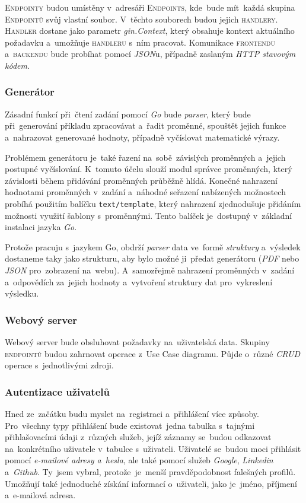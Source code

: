\documentclass[14pt,a4paper]{article}
\begin{document}
            \textsc{Endpointy} budou umístěny v~adresáři \textsc{Endpoints}, kde~bude mít~každá skupina \textsc{Endpointů} svůj vlastní soubor. V~těchto souborech budou jejich \textsc{handlery}. \textsc{Handler} dostane jako parametr \emph{gin.Context}, který obsahuje kontext aktuálního požadavku a~umožňuje \textsc{handleru} s~ním pracovat. Komunikace \textsc{frontendu} a~\textsc{backendu} bude probíhat pomocí \emph{JSON}u, případně zaslaným \emph{HTTP stavovým kódem}.

            \subsubsection{Generátor}
            Zásadní funkcí při~čtení zadání pomocí \emph{Go} bude \emph{parser}, který bude při~generování příkladu zpracovávat a~řadit proměnné, spouštět jejich funkce a~nahrazovat generované hodnoty, případně vyčíslovat matematické výrazy.
            
            Problémem generátoru je~také řazení na~sobě~závislých proměnných a~jejich postupné vyčíslování. K~tomuto účelu slouží modul správce proměnných, který závislosti během přidávání proměnných průběžně hlídá. Konečné nahrazení hodnotami proměnných v~zadání a~náhodné seřazení nabízených možnostech probíhá použitím balíčku \texttt{text/template}, který nahrazení zjednodušuje přidáním možnosti využití šablony s~proměnnými. Tento balíček je~dostupný v~základní instalaci jazyka \emph{Go}. \cite{GoTextTemplate}

            Protože pracuju s~jazykem Go, obdrží \emph{parser} data ve~formě \emph{struktury} a~výsledek dostaneme taky jako strukturu, aby bylo možné ji~předat generátoru (\emph{PDF} nebo \emph{JSON} pro~zobrazení na~webu). A~samozřejmě nahrazení proměnných v~zadání a~odpovědích za~jejich hodnoty a~vytvoření struktury dat pro~vykreslení výsledku.

            \subsubsection{Webový server}
            Webový server bude obsluhovat požadavky na~uživatelská data. Skupiny \textsc{endpointů} budou zahrnovat operace z~Use Case diagramu. Půjde o~různé \emph{CRUD} operace s~jednotlivými zdroji.

            \subsubsection{Autentizace uživatelů}
            Hned ze~začátku budu myslet na~registraci a~přihlášení více způsoby. Pro~všechny typy přihlášení bude existovat~jedna tabulka s~tajnými přihlašovacími údaji z~různých služeb, jejíž záznamy se~budou odkazovat na~konkrétního uživatele v~tabulce s~uživateli. Uživatelé se~budou moci přihlásit pomocí \emph{e-mailové adresy a~hesla}, ale také pomocí služeb \emph{Google}, \emph{Linkedin} a~\emph{Github}. Ty~jsem vybral, protože~je~menší pravděpodobnost falešných profilů. Umožňují také jednoduché získání informací o~uživateli, jako je~jméno, příjmení a~e-mailová adresa.
            
\end{document}
